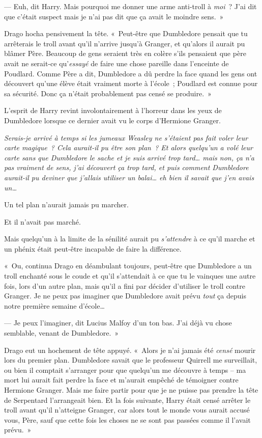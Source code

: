 --- Euh, dit Harry. Mais pourquoi me donner une arme anti-troll à \emph{moi}~? J'ai dit que c'était suspect mais je n'ai pas dit que ça avait le moindre sens.~»

Drago hocha pensivement la tête. «~Peut-être que Dumbledore pensait que tu arrêterais le troll avant qu'il n'arrive jusqu'à Granger, et qu'alors il aurait pu blâmer Père. Beaucoup de gens seraient très en colère s'ils pensaient que père avait ne serait-ce qu'\emph{essayé} de faire une chose pareille dans l'enceinte de Poudlard. Comme Père a dit, Dumbledore a dû perdre la face quand les gens ont découvert qu'une élève était vraiment morte à l'école~; Poudlard est connue pour sa sécurité. Donc ça n'était probablement pas censé se produire.~»

L'esprit de Harry revint involontairement à l'horreur dans les yeux de Dumbledore lorsque ce dernier avait vu le corps d'Hermione Granger.

\emph{Serais-je arrivé à temps si les jumeaux Weasley ne s'étaient pas fait voler leur carte magique~? Cela aurait-il pu être son plan~? Et alors quelqu'un a volé leur carte sans que Dumbledore le sache et je suis arrivé trop tard… mais non, ça n'a pas vraiment de sens, j'ai découvert ça trop tard, et puis comment Dumbledore aurait-il pu deviner que j'allais utiliser un balai… eh bien il savait que j'en avais un…}

Un tel plan n'aurait jamais pu marcher.

Et il n'avait pas marché.

Mais quelqu'un à la limite de la sénilité aurait pu \emph{s'attendre} à ce qu'il marche et un phénix était peut-être incapable de faire la différence.

«~Ou, continua Drago en déambulant toujours, peut-être que Dumbledore a un troll enchanté sous le coude et qu'il s'attendait à ce que tu le vainques une autre fois, lors d'un autre plan, mais qu'il a fini par décider d'utiliser le troll contre Granger. Je ne peux pas imaginer que Dumbledore avait prévu \emph{tout} ça depuis notre première semaine d'école…

--- Je peux l'imaginer, dit Lucius Malfoy d'un ton bas. J'ai déjà vu chose semblable, venant de Dumbledore.~»

Drago eut un hochement de tête appuyé. «~Alors je n'ai jamais été \emph{censé} mourir lors du premier plan. Dumbledore savait que le professeur Quirrell me surveillait, ou bien il comptait s'arranger pour que quelqu'un me découvre à temps -- ma mort lui aurait fait perdre la face et m'aurait empêché de témoigner contre Hermione Granger. Mais me faire partir pour que je ne puisse pas prendre la tête de Serpentard l'arrangeait bien. Et la fois suivante, Harry était censé arrêter le troll avant qu'il n'atteigne Granger, car alors tout le monde vous aurait accusé vous, Père, sauf que cette fois les choses ne se sont pas passées comme il l'avait prévu.~»

